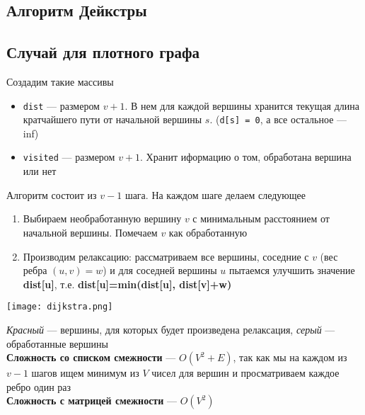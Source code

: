 \documentclass[a4paper]{article}
\newcommand{\code}[1]{\colorbox{codegray}{\texttt{#1}}}
\begin{document}
\subsection{Алгоритм Дейкстры}
\subsection*{Случай для плотного графа}
Создадим такие массивы
\begin{itemize}
    \item \code{dist} — размером $v+1$. В нем для каждой вершины хранится текущая длина кратчайшего пути от начальной вершины $s$. (\code{d[s] = 0}, а все остальное — inf)
    \item \code{visited} — размером $v+1$. Хранит иформацию о том, обработана вершина или нет
\end{itemize}
Алгоритм состоит из $v-1$ шага. На каждом шаге делаем следующее
\begin{enumerate}
    \item Выбираем необработанную вершину $v$ с минимальным расстоянием от начальной вершины. Помечаем $v$ как обработанную
    \item Производим релаксацию: рассматриваем все вершины, соседние с $v$ (вес ребра $(u,v)=w$) и для соседней вершины $u$ пытаемся улучшить значение \textbf{dist[u]}, т.е. \textbf{dist[u]=min(dist[u], dist[v]+w)}
\end{enumerate}
\begin{center}
    \texttt{[image: dijkstra.png]}
    \label{dijkstra}
\end{center}
\textit{Красный} — вершины, для которых будет произведена релаксация, \textit{серый} — обработанные вершины\\[2mm]
\textbf{Сложность со списком смежности} — $O(V^2+E)$, так как мы на каждом из $v-1$ шагов ищем минимум из $V$ чисел для вершин и просматриваем каждое ребро один раз\\[2mm]
\textbf{Сложность с матрицей смежности} — $O(V^2)$
\end{document}
